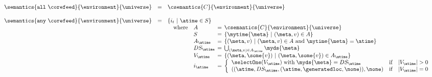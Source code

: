 \begin{figure*}[t]
\[\begin{array}{lcl}
\\



\\\\

\semantics{\mathtt{all}\ \corefeed}{\environment}{\universe} 
&=& 
\csemantics{C}{\environment}{\universe}
\\\\


\semantics{\mathtt{any}\ \corefeed}{\environment}{\universe}
& = & \{ i_t\ |\ \atime \in S\}\\
&&
\begin{array}{l}
 \begin{array}{ll@{\hspace{1ex}}c@{\hspace{1ex}}l}
 \mbox{where} & A        & = &\csemantics{C}{\environment}{\universe}\\
              & S        & = & \{\mytime{\meta}\ |\ (\meta, v) \in A\}\\
              & A_\atime & = & \{(\meta,v)\ | \ (\meta, v) \in A\ \mbox{and} \ \mytime{\meta} = \atime\}\\
              & DS_\atime & = & \bigcup_{(\meta,v) \in A_\atime} \myds{\meta} \\
              & V_\atime & = & \{(\meta,\some{v})\ | \ (\meta, \some{v}) \in A_\atime\}\\
              & i_\atime & = & \left\{ \begin{array}{lll}
                                           \mbox{\selectOne}(V_\atime) \; \mbox{with} \; \myds{\meta} = DS_\atime& \mbox{if} & |V_\atime| > 0\\
                                           ((\atime, DS_\atime, (\atime,\generatedloc,\none)), \none) & \mbox{if} & |V_\atime| = 0 \\
                                           \end{array} \right.
 \end{array}
\end{array} 
\\\\


\end{array}\]
\end{figure*}
